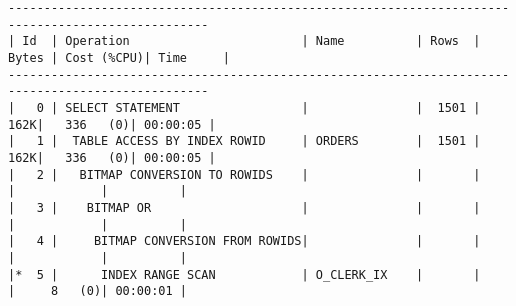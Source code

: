 \documentclass[11pt,a4paper,parskip=half]{scrartcl}
\begin{document}
\begin{lstlisting}
--------------------------------------------------------------------------------------------------                                                                                                                                                                                                           
| Id  | Operation                        | Name          | Rows  | Bytes | Cost (%CPU)| Time     |                                                                                                                                                                                                           
--------------------------------------------------------------------------------------------------                                                                                                                                                                                                           
|   0 | SELECT STATEMENT                 |               |  1501 |   162K|   336   (0)| 00:00:05 |                                                                                                                                                                                                           
|   1 |  TABLE ACCESS BY INDEX ROWID     | ORDERS        |  1501 |   162K|   336   (0)| 00:00:05 |                                                                                                                                                                                                           
|   2 |   BITMAP CONVERSION TO ROWIDS    |               |       |       |            |          |                                                                                                                                                                                                           
|   3 |    BITMAP OR                     |               |       |       |            |          |                                                                                                                                                                                                           
|   4 |     BITMAP CONVERSION FROM ROWIDS|               |       |       |            |          |                                                                                                                                                                                                           
|*  5 |      INDEX RANGE SCAN            | O_CLERK_IX    |       |       |     8   (0)| 00:00:01 |                                                                                                                                                                                                           

\end{lstlisting}
\end{document}
